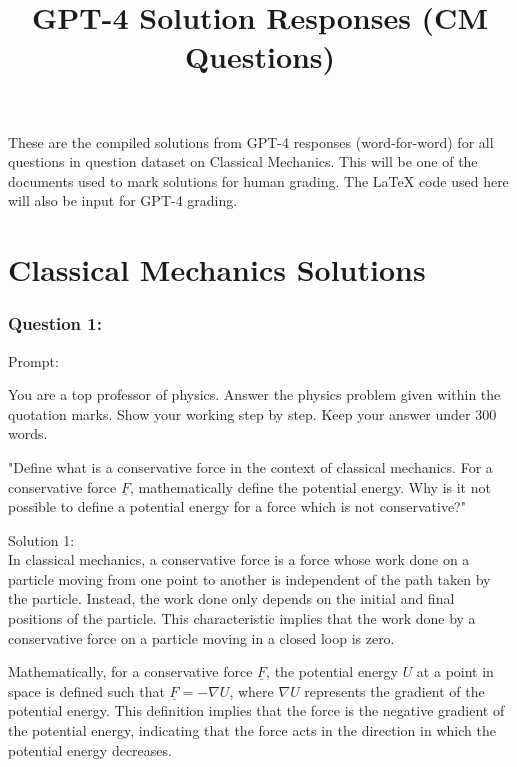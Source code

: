 \documentclass[a4paper,11pt]{article}
\begin{document}
\title{GPT-4 Solution Responses (CM Questions)}
\author{}
\date{}
\maketitle

\noindent These are the compiled solutions from GPT-4 responses (word-for-word) for all questions in question dataset on Classical Mechanics. This will be one of the documents used to mark solutions for human grading. The LaTeX code used here will also be input for GPT-4 grading. 

\section{Classical Mechanics Solutions}

\subsubsection*{Question 1:}

Prompt:
\begin{spverbatim}
    You are a top professor of physics. Answer the physics problem given within the quotation marks. Show your working step by step. Keep your answer under 300 words.

    "Define what is a conservative force in the context of classical mechanics. For a conservative force \( \underline{F} \), mathematically define the potential energy. Why is it not possible to define a potential energy for a force which is not conservative?"
\end{spverbatim}

\bigskip

\noindent Solution 1: \\

In classical mechanics, a conservative force is a force whose work done on a particle moving from one point to another is independent of the path taken by the particle. Instead, the work done only depends on the initial and final positions of the particle. This characteristic implies that the work done by a conservative force on a particle moving in a closed loop is zero.

Mathematically, for a conservative force \( \underline{F} \), the potential energy \( U \) at a point in space is defined such that \( \underline{F} = -\nabla U \), where \( \nabla U \) represents the gradient of the potential energy. This definition implies that the force is the negative gradient of the potential energy, indicating that the force acts in the direction in which the potential energy decreases.
\end{document}
